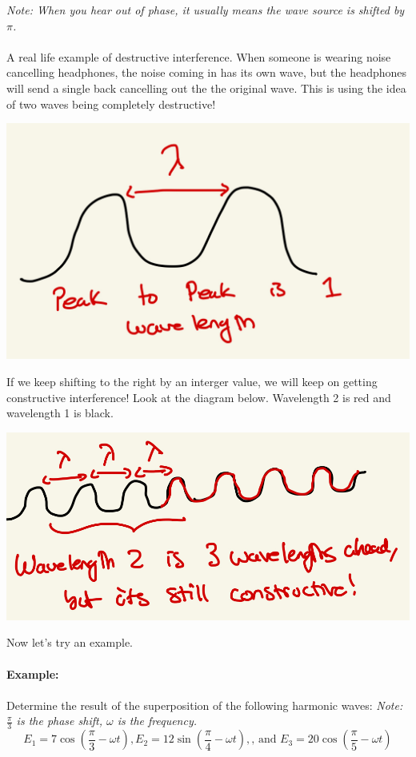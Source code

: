 \documentclass[10pt]{article}
\begin{document}
\textit{Note: When you hear out of phase, it usually means the wave source is shifted by $\pi$.}
\\ \\
A real life example of destructive interference. When someone is wearing noise cancelling headphones, the noise coming in has its own wave, but the headphones will send a single back cancelling out the the original wave. This is using the idea of two waves being completely destructive!
\begin{center}
    \includegraphics*[scale = .25]{imgs/wavelength-fact.jpeg}
\end{center}

\newpage

If we keep shifting to the right by an interger value, we will keep on getting constructive interference! Look at the diagram below. Wavelength 2 is red and wavelength 1 is black.

\begin{center}
    \includegraphics*[scale = .35]{imgs/interger-difference.jpeg}
\end{center}

Now let's try an example.\\ \\
\textbf{Example:} \\ \\ 
Determine the result of the superposition of the following harmonic waves:
\textit{Note: $\frac{\pi}{3}$ is the phase shift, $\omega$ is the frequency.}
\[E_1 = 7 \cos(\frac{\pi}{3} - \omega t), E_2 = 12 \sin(\frac{\pi}{4} - \omega t), \text{, and } E_3 = 20 \cos(\frac{\pi}{5} - \omega t)\]
\end{document}
